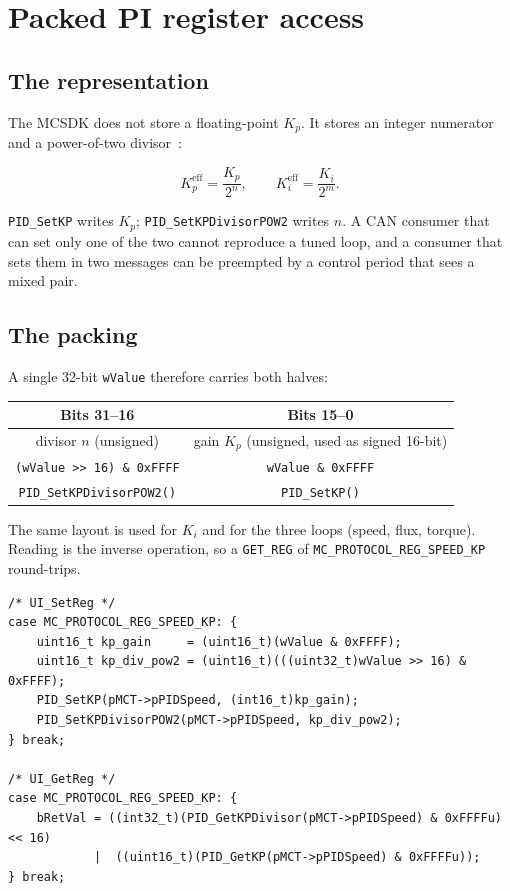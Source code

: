 \section{Packed PI register access}
\label{sec:pi-pack}

\subsection{The representation}
The MCSDK does not store a floating-point $K_p$. It stores an integer
numerator and a power-of-two divisor~\cite{astromhagglund2006,stmcsdk}:

\begin{equation}
K_p^{\mathrm{eff}} = \frac{K_p}{2^{n}}, \qquad
K_i^{\mathrm{eff}} = \frac{K_i}{2^{m}}.
\end{equation}

\texttt{PID\_SetKP} writes $K_p$; \texttt{PID\_SetKPDivisorPOW2} writes
$n$. A CAN consumer that can set only one of the two cannot reproduce a
tuned loop, and a consumer that sets them in two messages can be
preempted by a control period that sees a mixed pair.

\subsection{The packing}
A single 32-bit \texttt{wValue} therefore carries both halves:

\begin{center}
\begin{tabular}{cc}
\toprule
Bits 31--16 & Bits 15--0 \\
\midrule
divisor $n$ (unsigned) & gain $K_p$ (unsigned, used as signed 16-bit) \\
\texttt{(wValue >> 16) \& 0xFFFF} & \texttt{wValue \& 0xFFFF} \\
\texttt{PID\_SetKPDivisorPOW2()} & \texttt{PID\_SetKP()} \\
\bottomrule
\end{tabular}
\end{center}

The same layout is used for $K_i$ and for the three loops (speed, flux,
torque). Reading is the inverse operation, so a \texttt{GET\_REG} of
\texttt{MC\_PROTOCOL\_REG\_SPEED\_KP} round-trips.

\begin{lstlisting}[style=cstyle,caption={Packing and unpacking of SPEED\_KP.},label=lst:pi]
/* UI_SetReg */
case MC_PROTOCOL_REG_SPEED_KP: {
    uint16_t kp_gain     = (uint16_t)(wValue & 0xFFFF);
    uint16_t kp_div_pow2 = (uint16_t)(((uint32_t)wValue >> 16) & 0xFFFF);
    PID_SetKP(pMCT->pPIDSpeed, (int16_t)kp_gain);
    PID_SetKPDivisorPOW2(pMCT->pPIDSpeed, kp_div_pow2);
} break;

/* UI_GetReg */
case MC_PROTOCOL_REG_SPEED_KP: {
    bRetVal = ((int32_t)(PID_GetKPDivisor(pMCT->pPIDSpeed) & 0xFFFFu) << 16)
            |  ((uint16_t)(PID_GetKP(pMCT->pPIDSpeed) & 0xFFFFu));
} break;
\end{lstlisting}

